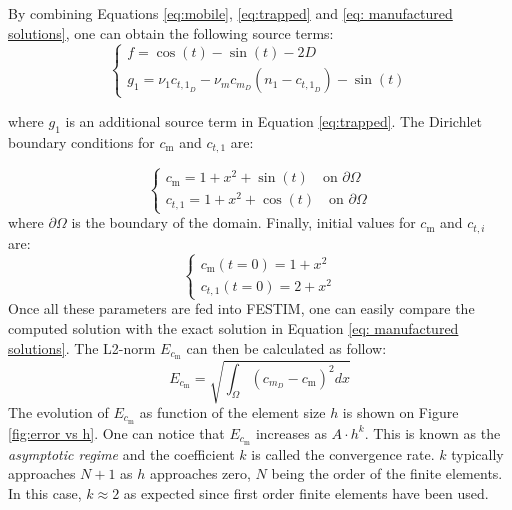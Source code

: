 By combining Equations \ref{eq:mobile}, \ref{eq:trapped} and \ref{eq: manufactured solutions}, one can obtain the following source terms:
\begin{equation}
    \begin{cases}
    f = \cos(t) - \sin(t) - 2D \\
    g_1 = \nu_1 c_{{t,1}_D} - \nu_m c_{m_D} ( n_1 - c_{{t,1}_D}) - \sin(t)
    \end{cases}
    \label{eq:sources}
\end{equation}

where $g_1$ is an additional source term in Equation \ref{eq:trapped}.
The Dirichlet boundary conditions for $c_\mathrm{m}$ and $c_{t,1}$ are:

\begin{equation}
    \begin{cases}
    c_\mathrm{m} = 1 + x^2 + \sin(t) \quad \text{on } \partial \Omega \\
    c_{t,1} = 1 + x^2 + \cos(t) \quad \text{on } \partial \Omega 
    \end{cases}
\end{equation}
where $\partial\Omega$ is the boundary of the domain.
Finally, initial values for $c_\mathrm{m}$ and $c_{t,i}$ are:
\begin{equation}
    \begin{cases}
    c_\mathrm{m}(t=0) = 1 + x^2 \\
    c_{t,1}(t=0) = 2 + x^2
    \end{cases}
\end{equation}
Once all these parameters are fed into FESTIM, one can easily compare the computed solution with the exact solution in Equation \ref{eq: manufactured solutions}.
The L2-norm $E_{c_\mathrm{m}}$ can then be calculated as follow:
\begin{equation}
    E_{c_\mathrm{m}} = \sqrt{\int_\Omega(c_{m_D} - c_\mathrm{m})^2dx}
\end{equation}
The evolution of $E_{c_\mathrm{m}}$ as function of the element size $h$ is shown on Figure \ref{fig:error vs h}.
One can notice that $E_{c_\mathrm{m}}$ increases as $A\cdot h^k$.
This is known as the \textit{asymptotic regime} and the coefficient $k$ is called the convergence rate.
$k$ typically approaches $N+1$ as $h$ approaches zero, $N$ being the order of the finite elements.
In this case, $k \approx 2$ as expected since first order finite elements have been used.


